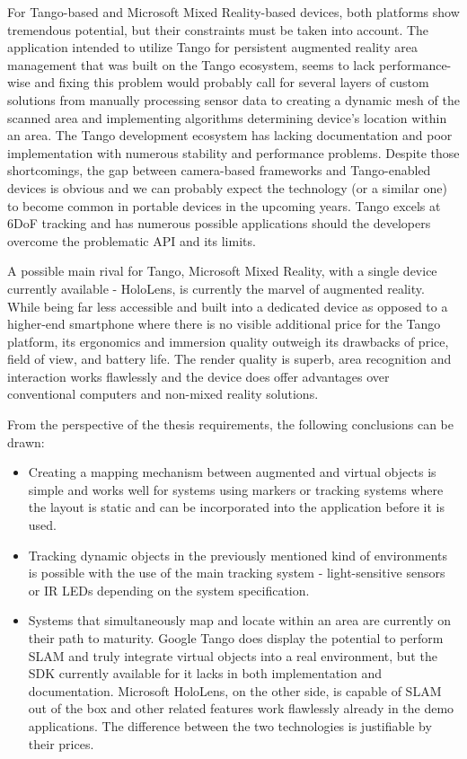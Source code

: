 \documentclass[12pt, a4paper]{article}
\begin{document}
For Tango-based and Microsoft Mixed Reality-based devices, both platforms show tremendous potential, but their constraints must be taken into account. The application intended to utilize Tango for persistent augmented reality area management that was built on the Tango ecosystem, seems to lack performance-wise and fixing this problem would probably call for several layers of custom solutions from manually processing sensor data to creating a dynamic mesh of the scanned area and implementing algorithms determining device’s location within an area. The Tango development ecosystem has lacking documentation and poor implementation with numerous stability and performance problems. Despite those shortcomings, the gap between camera-based frameworks and Tango-enabled devices is obvious and we can probably expect the technology (or a similar one) to become common in portable devices in the upcoming years. Tango excels at 6DoF tracking and has numerous possible applications should the developers overcome the problematic API and its limits.

A possible main rival for Tango, Microsoft Mixed Reality, with a single device currently available - HoloLens, is currently the marvel of augmented reality. While being far less accessible and built into a dedicated device as opposed to a higher-end smartphone where there  is no visible additional price for the Tango platform, its ergonomics and immersion quality outweigh its drawbacks of price, field of view, and battery life. The render quality is superb, area recognition and interaction works flawlessly and the device does offer advantages over conventional computers and non-mixed reality solutions.

From the perspective of the thesis requirements, the following conclusions can be drawn:\\
\begin{itemize}
\item Creating a mapping mechanism between augmented and virtual objects is simple and works well for systems using markers or tracking systems where the layout is static and can be incorporated into the application before it is used. 
\item Tracking dynamic objects in the previously mentioned kind of environments is possible with the use of the main tracking system - light-sensitive sensors or IR LEDs depending on the system specification.
\item Systems that simultaneously map and locate within an area are currently on their path to maturity. Google Tango does display the potential to perform SLAM and truly integrate virtual objects into a real environment, but the SDK currently available for it lacks in both implementation and documentation. Microsoft HoloLens, on the other side, is capable of SLAM out of the box and other related features work flawlessly already in the demo applications. The difference between the two technologies is justifiable by their prices.
\end{itemize}
\end{document}
